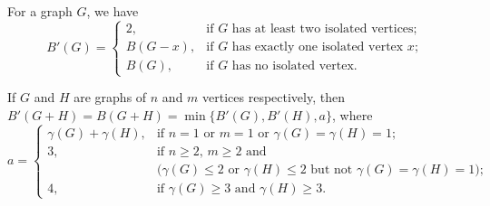 \documentclass[10pt,a4paper]{amsart}
\begin{document}
\begin{proposition}\label{2nd}
For a graph $G$, we have 
$$
B'(G)=\left\{\begin{array}{ll}
         2,      & \mbox{if $G$ has at least two isolated vertices}; \\
         B(G-x), & \mbox{if $G$ has exactly one isolated vertex $x$}; \\
         B(G),   & \mbox{if $G$ has no isolated vertex}.
             \end{array}
       \right.
$$ 
\end{proposition}

\begin{theorem} \label{join}
If $G$ and $H$ are graphs of $n$ and $m$ vertices respectively, then
$B'(G+H)=B(G+H)=\min\{B'(G),B'(H),a\}$, where
$$
a=\left\{\begin{array}{ll}
 \gamma(G)+\gamma(H), & \mbox{if $n=1$ or $m=1$ or $\gamma(G)=\gamma(H)=1$}; \\
 3,                   & \mbox{if $n\ge 2$, $m\ge 2$ and}\\ 
                      & \mbox{$(\gamma(G)\le 2$ or $\gamma(H)\le 2$ but not $\gamma(G)=\gamma(H)=1)$}; \\
 4,                   & \mbox{if $\gamma(G)\ge 3$ and $\gamma(H)\ge 3$}.
  \end{array}\right.
$$
\end{theorem}
\end{document}
